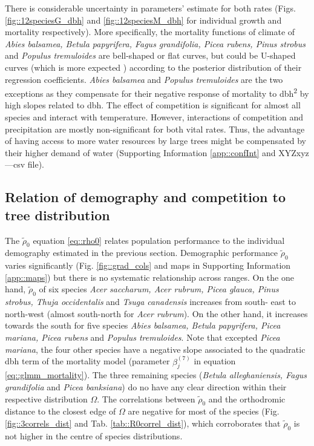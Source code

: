 There is considerable uncertainty in parameters' estimate for both rates (Figs. \ref{fig::12speciesG_dbh} and \ref{fig::12speciesM_dbh} for individual growth and mortality respectively). More specifically, the mortality functions of climate of \textit{Abies balsamea, Betula papyrifera, Fagus grandifolia, Picea rubens, Pinus strobus} and \textit{Populus tremuloides} are bell-shaped or flat curves, but could be U-shaped curves (which is more expected \citep{Lines2010}) according to the posterior distribution of their regression coefficients. \textit{Abies balsamea} and \textit{Populus tremuloides} are the two exceptions as they compensate for their negative response of mortality to dbh\textsuperscript{2} by high slopes related to dbh. The effect of competition is significant for almost all species and interact with temperature. However, interactions of competition and precipitation are mostly non-significant for both vital rates. Thus, the advantage of having access to more water resources by large trees might be compensated by their higher demand of water (Supporting Information \ref{app::confInt} and XYZxyz---csv file).

\subsection{Relation of demography and competition to tree distribution} %
The $ \tilde \rho_0 $ equation \eqref{eq::rho0} relates population performance to the individual demography estimated in the previous section. Demographic performance $ \tilde \rho_0 $ varies significantly (Fig. \ref{fig::grad_cols} and maps in Supporting Information \ref{app::maps}) but there is no systematic relationship across ranges. On the one hand, $ \tilde \rho_0 $ of six species \textit{Acer saccharum, Acer rubrum, Picea glauca, Pinus strobus, Thuja occidentalis} and \textit{Tsuga canadensis} increases from south- east to north-west (almost south-north for \textit{Acer rubrum}). On the other hand, it increases towards the south for five species \textit{Abies balsamea, Betula papyrifera, Picea mariana, Picea rubens} and \textit{Populus tremuloides}. Note that excepted \textit{Picea mariana}, the four other species have a negative slope associated to the quadratic dbh term of the mortality model (parameter $ \beta_j^{(7)} $ in equation \eqref{eq::glmm_mortality}). The three remaining species (\textit{Betula alleghaniensis, Fagus grandifolia} and \textit{Picea banksiana}) do no have any clear direction within their respective distribution $ \Omega $. The correlations between $ \tilde \rho_0 $ and the orthodromic distance to the closest edge of $ \Omega $ are negative for most of the species (Fig. \ref{fig::3correls_dist} and Tab. \ref{tab::R0correl_dist}), which corroborates that $ \tilde \rho_0 $ is not higher in the centre of species distributions.

